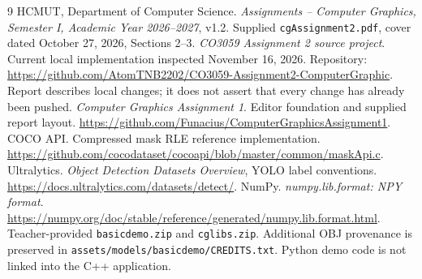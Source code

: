 \documentclass[12pt,a4paper]{article}
\newcommand{\code}[1]{{\small\nolinkurl{#1}}}
\begin{document}
\clearpage
{}
\begin{thebibliography}{9}
 HCMUT, Department of Computer Science. \textit{Assignments -- Computer Graphics, Semester I, Academic Year 2026--2027}, v1.2. Supplied \code{cgAssignment2.pdf}, cover dated October 27, 2026, Sections 2--3.
 \textit{CO3059 Assignment 2 source project}. Current local implementation inspected November 16, 2026. Repository: \url{https://github.com/AtomTNB2202/CO3059-Assignment2-ComputerGraphic}. Report describes local changes; it does not assert that every change has already been pushed.
 \textit{Computer Graphics Assignment 1}. Editor foundation and supplied report layout. \url{https://github.com/Funacius/ComputerGraphicsAssignment1}.
 COCO API. Compressed mask RLE reference implementation. \url{https://github.com/cocodataset/cocoapi/blob/master/common/maskApi.c}.
 Ultralytics. \textit{Object Detection Datasets Overview}, YOLO label conventions. \url{https://docs.ultralytics.com/datasets/detect/}.
 NumPy. \textit{numpy.lib.format: NPY format}. \url{https://numpy.org/doc/stable/reference/generated/numpy.lib.format.html}.
 Teacher-provided \code{basicdemo.zip} and \code{cglibs.zip}. Additional OBJ provenance is preserved in \code{assets/models/basicdemo/CREDITS.txt}. Python demo code is not linked into the C++ application.
\end{thebibliography}
\end{document}
